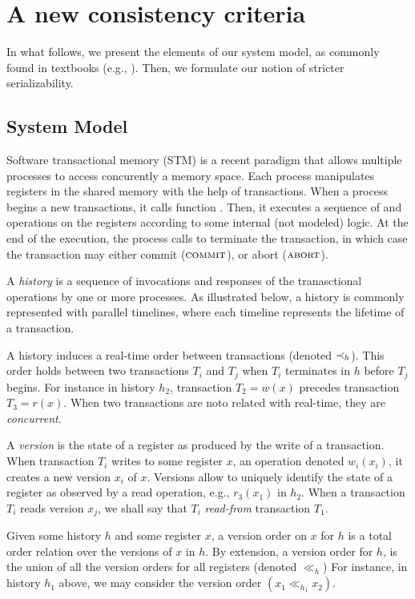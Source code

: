 \section{A new consistency criteria}

In what follows, we present the elements of our system model, as commonly found in textbooks (e.g., \cite{}).
Then, we formulate our notion of stricter serializability.

\subsection{System Model}

Software transactional memory (STM) is a recent paradigm that allows multiple processes to access concurently a memory space.
Each process manipulates registers in the shared memory with the help of transactions.
When a process begins a new transactions, it calls function \stmBeginFunction.
Then, it executes a sequence of \stmReadFunction and \stmWriteFunction operations on the registers according to some internal (not modeled) logic.
At the end of the execution, the process calls \stmTryCommitFunction to terminate the transaction, in which case the transaction may either commit ($\text{\textsc{commit}}$), or abort ($\text{\textsc{abort}}$).

A \emph{history} is a sequence of invocations and responses of the tranasctional operations by one or more processes.
As illustrated below, a history is commonly represented with parallel timelines, where each timeline represents the lifetime of a transaction.

A history induces a real-time order between transactions (denoted $\hb_h$).
This order holds between two transactions $T_i$ and $T_j$ when $T_i$ terminates in $h$ before $T_j$ begins.
For instance in history $h_2$, transaction $T_2=w(x)$ precedes transaction $T_3=r(x)$.
When two transactions are noto related with real-time, they are \emph{concurrent}.

A \emph{version} is the state of a register as produced by the write of a transaction.
When transaction $T_i$ writes to some register $x$, an operation denoted $w_i(x_i)$, it creates a new version $x_i$ of $x$.
Versions allow to uniquely identify the state of a register as observed by a read operation, e.g., $r_3(x_1)$ in $h_2$.
When a transaction $T_i$ reads version $x_j$, we shall say that $T_i$ \emph{read-from} transaction $T_1$.

Given some history $h$ and some register $x$, a version order on $x$ for $h$ is a total order relation over the versions of $x$ in $h$.
By extension, a version order for $h$, is the union of all the version orders for all registers (denoted $\ll_h$)
For instance, in history $h_1$ above,  we may consider the version order $(x_1 \ll_{h_1} x_2)$.

